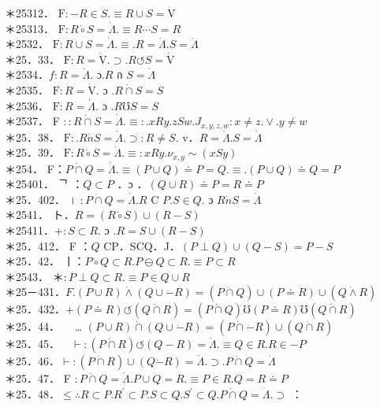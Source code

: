 \documentclass[10pt]{article}
\begin{document}
＊25312． $\mathrm{F}:-R \in S . \equiv R \cup S=\dot{\mathrm{V}}$\\
＊25313． $\mathrm{F}: R \dot{\circ} S=\dot{\Lambda} . \equiv R \cdots S=R$\\
＊2532． $\mathrm{F}: R \cup S=\dot{\Lambda} . \equiv . R=\dot{\Lambda} . S=\dot{\Lambda}$\\
＊25．33． $\mathrm{F}: R=\dot{\mathrm{V}} . \supset . R \circlearrowleft S=\dot{\mathrm{V}}$\\
＊2534．$f: R=\dot{\Lambda}$. ɔ.$R$ ก $S=\dot{\Lambda}$\\
＊2535． $\mathrm{F}: R=\dot{\mathrm{V}}$. ɔ $. R \dot{\cap} S=S$\\
＊2536． $\mathrm{F}: R=\dot{\Lambda}$. ɔ $. R \mho S=S$\\
＊2537． F $:: R \dot{\cap} S=\dot{\Lambda} . \equiv: . x R y . z S w . J_{x, y, z, w}: x \neq z . \vee . y \neq w$\\
＊25．38． $\mathrm{F}: . R \dot{n} S=\dot{\Lambda} . \supset: R \neq S$. v．$R=\dot{\Lambda} . S=\dot{\Lambda}$\\
＊25．39． $\mathrm{F}: R \dot{\circ} S=\dot{\Lambda} . \equiv: x R y . \nu_{x, y} \sim(x S y)$\\
＊254． F：$P \dot{\cap} Q=\dot{\Lambda} . \equiv(P \cup Q) \doteq P=Q . \equiv .(P \cup Q) \doteq Q=P$\\
＊25401． ᄀ ：$Q \subset P$ ．ɔ ．$(Q \cup R) \doteq P=R \doteq P$\\
＊25．402． । $: P \dot{\cap} Q=\dot{\Lambda} . R$ C $P . S \in Q$. ɔ $R \dot{n} S=\dot{\Lambda}$\\
＊2541． ト．$R=(R \dot{\circ} S) \cup(R-S)$\\
＊25411．$+: S \subset R$. ɔ $. R=S \cup(R-S)$\\
＊25．412． F ：$Q$ CP．SCQ．J．$(P \perp Q) \cup(Q-S)=P-S$\\
＊25．42． ㅣ：$P \dot{\circ} Q \subset R . P \ominus Q \subset R . \equiv P \subset R$\\
＊2543． ＊$: P \perp Q \subset R . \equiv P \in Q \cup R$\\
＊25－431．$F .(P \cup R) \dot{\wedge}(Q \cup \dot{-} R)=(P \dot{\cap} Q) \cup(P \doteq R) \cup(Q \dot{\wedge} R)$\\
＊25．432．$+(P \doteq R) \circlearrowleft(Q \dot{\cap} R)=(P \dot{\cap} Q) \mho(P \doteq R) \mho(Q \dot{\cap} R)$\\
＊25．44．$\quad$ … $(P \cup R) \dot{\cap}(Q \cup \dot{-} R)=(P \dot{\cap} \dot{-} R) \cup(Q \dot{\cap} R)$\\
＊25．45．$\quad \vdash:(P \dot{\cap} R) \circlearrowleft(Q-R)=\dot{\Lambda} . \equiv Q \in R . R \in-P$\\
＊25．46．$\vdash:(P \dot{\cap} R) \cup(Q \dot{-} R)=\dot{\Lambda} . \supset . P \dot{\cap} Q=\dot{\Lambda}$\\
＊25．47． F $: P \dot{\cap} Q=\dot{\Lambda} . P \cup Q=R . \equiv P \in R . Q=R \doteq P$\\
＊25．48．$\leqslant \therefore R \subset P . R^{\prime} \subset P . S \subset Q . S^{\prime} \subset Q . P \dot{\cap} Q=\dot{\Lambda} . \supset$ ：
\end{document}
